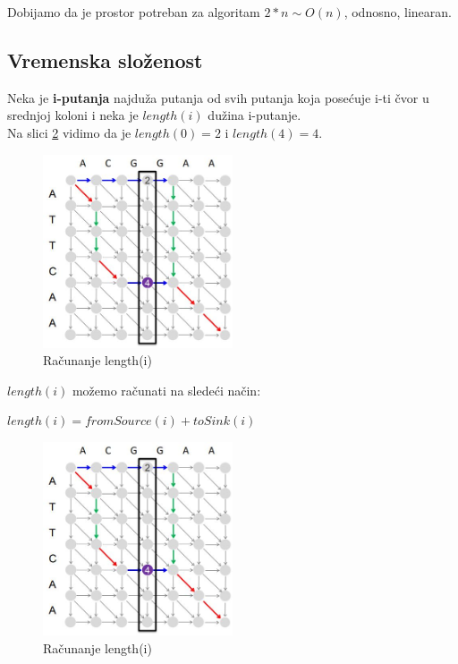 Dobijamo da je prostor potreban za algoritam $2*n \sim O(n)$, odnosno, linearan. \\

\subsection{Vremenska složenost}

Neka je \textbf{i-putanja} najduža putanja od svih putanja koja posećuje i-ti čvor u srednjoj koloni i neka je \textbf{$length(i)$} dužina i-putanje.\\

Na slici \ref{slika:iputanja} vidimo da je $length(0)=2$ i $length(4)=4$. \\


\begin{figure}[h]
\centering
\includegraphics[width=0.5\textwidth]{poglavlja/5/slike/i_putanje.JPG}
\caption{Računanje length(i)}
\label{slika:iputanja}
\end{figure}


$length(i)$ možemo računati na sledeći način:
\begin{center}
$length(i) = fromSource(i) + toSink(i)$
\end{center}

\begin{figure}[h]
\centering
\includegraphics[width=0.5\textwidth]{poglavlja/5/slike/i_putanje.JPG}
\caption{Računanje length(i)}
\label{slika:iputanja}
\end{figure}

